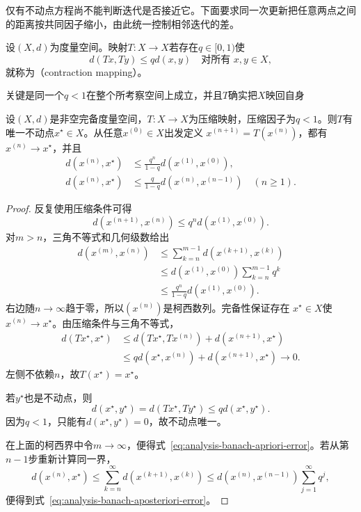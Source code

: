 仅有不动点方程尚不能判断迭代是否接近它。下面要求同一次更新把任意两点之间的距离按共同因子缩小，由此统一控制相邻迭代的差。
\begin{definition}[压缩映射]
\label{def:analysis-contraction}
设$(X,d)$为度量空间。映射$T:X\to X$若存在$q\in[0,1)$使
\begin{equation}
  d(Tx,Ty)\leq qd(x,y)
  \quad\text{对所有 }x,y\in X,
\label{eq:analysis-contraction-definition}
\end{equation}
就称为（contraction mapping）。
\end{definition}
关键是同一个$q<1$在整个所考察空间上成立，并且$T$确实把$X$映回自身
\begin{theorem}[Banach压缩映射定理]
\label{thm:analysis-banach-fixed-point}
设$(X,d)$是非空完备度量空间，$T:X\to X$为压缩映射，压缩因子为$q<1$。则$T$有
唯一不动点$x^\star\in X$。从任意$x^{(0)}\in X$出发定义
$x^{(n+1)}=T(x^{(n)})$，都有$x^{(n)}\to x^\star$，并且
\begin{align}
  d(x^{(n)},x^\star)
  &\leq
  \frac{q^n}{1-q}d(x^{(1)},x^{(0)}),
\label{eq:analysis-banach-apriori-error}\\
  d(x^{(n)},x^\star)
  &\leq
  \frac{q}{1-q}d(x^{(n)},x^{(n-1)})
  \quad(n\geq1).
\label{eq:analysis-banach-aposteriori-error}
\end{align}
\end{theorem}
\begin{proof}
反复使用压缩条件可得
\[   d(x^{(n+1)},x^{(n)})   \leq   q^n d(x^{(1)},x^{(0)}). \]
对$m>n$，三角不等式和几何级数给出
\begin{align*}
  d(x^{(m)},x^{(n)})
  &\leq
  \sum_{k=n}^{m-1}d(x^{(k+1)},x^{(k)})\\
  &\leq
  d(x^{(1)},x^{(0)})\sum_{k=n}^{m-1}q^k\\
  &\leq
  \frac{q^n}{1-q}d(x^{(1)},x^{(0)}).
\end{align*}
右边随$n\to\infty$趋于零，所以$(x^{(n)})$是柯西数列。完备性保证存在
$x^\star\in X$使$x^{(n)}\to x^\star$。由压缩条件与三角不等式，
\begin{align*}
 d(Tx^\star,x^\star)
 &\leq d(Tx^\star,Tx^{(n)})+d(x^{(n+1)},x^\star)\\
 &\leq qd(x^\star,x^{(n)})+d(x^{(n+1)},x^\star)
 \longrightarrow0.
\end{align*}
左侧不依赖$n$，故$T(x^\star)=x^\star$。

若$y^\star$也是不动点，则
\[   d(x^\star,y^\star)   =   d(Tx^\star,Ty^\star)   \leq qd(x^\star,y^\star). \]
因为$q<1$，只能有$d(x^\star,y^\star)=0$，故不动点唯一。

在上面的柯西界中令$m\to\infty$，便得式~\eqref{eq:analysis-banach-apriori-error}。若从第$n-1$步重新计算同一界，
\[   d(x^{(n)},x^\star)   \leq   \sum_{k=n}^{\infty}d(x^{(k+1)},x^{(k)})   \leq   d(x^{(n)},x^{(n-1)})\sum_{j=1}^{\infty}q^j, \]
便得到式~\eqref{eq:analysis-banach-aposteriori-error}。
\end{proof}


